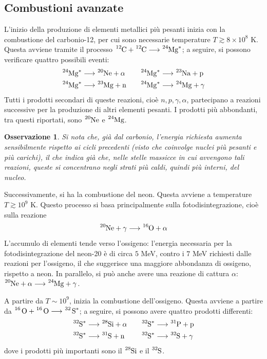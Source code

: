 \documentclass[11pt, a4paper]{scrartcl}
\theoremstyle{style}
\newtheorem{osservazione}{Osservazione}[section]
\theoremstyle{style1}
\numberwithin{equation}{subsection}
\begin{document}
\subsection{Combustioni avanzate}
L'inizio della produzione di elementi metallici pi\`u pesanti inizia con la combustione del carbonio-12, per cui sono necessarie temperature $T \gtrsim 8 \times 10^8$ K. 
Questa avviene tramite il processo $\ce{^{12}C + ^{12}C} \longrightarrow \ce{^{24}Mg^*}$; a seguire, si possono verificare quattro possibili eventi:
	\begin{align*}
		\ce{^{24}Mg^*} &\longrightarrow \ce{^{20}Ne + \alpha } &\quad \ce{^{24}Mg^*} &\longrightarrow \ce{^{23}Na + p} \\
		\ce{^{24}Mg^*} &\longrightarrow \ce{^{23}Mg + n} &\quad \ce{^{24}Mg^*} &\longrightarrow \ce{^{24}Mg + \gamma}
	\end{align*}
Tutti i prodotti secondari di queste reazioni, cio\`e $n,p,\gamma,\alpha $, partecipano a reazioni successive per la produzione di altri elementi pesanti.
I prodotti pi\`u abbondanti, tra questi riportati, sono $\ce{^{20}Ne}$ e $\ce{^{24}Mg}$.
\begin{osservazione}
Si nota che, gi\`a dal carbonio, l'energia richiesta aumenta sensibilmente rispetto ai cicli precedenti (visto che coinvolge nuclei pi\`u pesanti e pi\`u carichi), il che indica gi\`a che, nelle stelle massicce in cui avvengono tali reazioni, queste si concentrano negli strati pi\`u caldi, quindi pi\`u interni, del nucleo.
\end{osservazione}

Successivamente, si ha la combustione del neon. Questa avviene a temperature $T\gtrsim 10^9$ K.
Questo processo si basa principalmente sulla fotodisintegrazione, cio\`e sulla reazione 
\[
	\ce{^{20}Ne + \gamma} \longrightarrow \ce{^{16}O + \alpha }
\] 
L'accumulo di elementi tende verso l'ossigeno: l'energia necessaria per la fotodisintegrazione del neon-20 \`e di circa $5$ MeV, contro i $7$ MeV richiesti dalle reazioni per l'ossigeno, il che suggerisce una maggiore abbondanza di ossigeno, rispetto a neon.
In parallelo, si pu\`o anche avere una reazione di cattura $\alpha $: $\ce{^{20}Ne + \alpha } \longrightarrow \ce{^{24}Mg +\gamma} $.

A partire da $T \sim 10^9$, inizia la combustione dell'ossigeno.
Questa avviene a partire da $\ce{^{16} O + ^{16} O} \longrightarrow \ce{^{32} S^*} $; a seguire, si possono avere quattro prodotti differenti:
\begin{align*}
	\ce{^{32}S^*} & \longrightarrow \ce{^{28}Si + \alpha } &\quad \ce{^{32}S^*} & \longrightarrow \ce{^{31}P + p} \\
	\ce{^{32}S^*} & \longrightarrow\ce{^{31}S + n} &\quad \ce{^{32}S^*} & \longrightarrow \ce{^{32}S + \gamma}
\end{align*}
dove i prodotti pi\`u importanti sono il $\ce{^{28}Si}$ e il $\ce{^{32}S} $.
\end{document}
